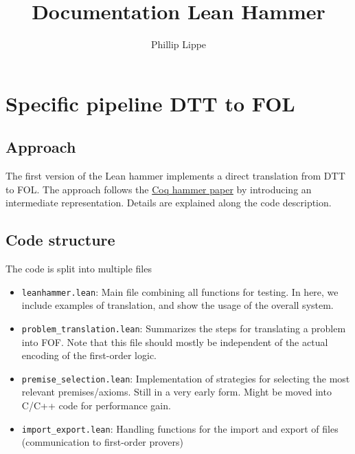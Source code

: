 \documentclass[a4paper]{article}
\title{Documentation Lean Hammer}
\author{Phillip Lippe}
\begin{document}
\maketitle
\tableofcontents
\newpage

\section{Specific pipeline DTT to FOL}
\subsection{Approach}
The first version of the Lean hammer implements a direct translation from DTT to FOL. The approach follows the \href{https://link.springer.com/article/10.1007/s10817-018-9458-4}{Coq hammer paper} \cite{CoqHammer} by introducing an intermediate representation. Details are explained along the code description.
\subsection{Code structure}
The code is split into multiple files
\begin{itemize}
	\item \texttt{leanhammer.lean}: Main file combining all functions for testing. In here, we include examples of translation, and show the usage of the overall system.
	\item \texttt{problem\_translation.lean}: Summarizes the steps for translating a problem into FOF. Note that this file should mostly be independent of the actual encoding of the first-order logic.
	\item \texttt{premise\_selection.lean}: Implementation of strategies for selecting the most relevant premises/axioms. Still in a very early form. Might be moved into C/C++ code for performance gain. 
	\item \texttt{import\_export.lean}: Handling functions for the import and export of files (communication to first-order provers)
\end{itemize}
\end{document}
